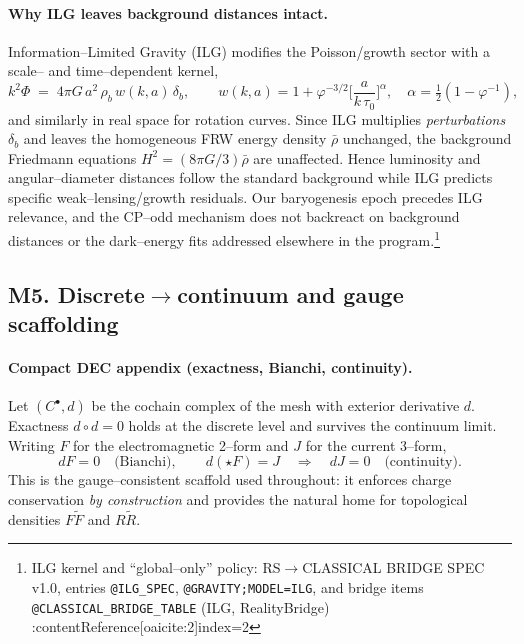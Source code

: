 \documentclass[11pt]{article}
\begin{document}
\paragraph{Why ILG leaves background distances intact.}
Information–Limited Gravity (ILG) modifies the Poisson/growth sector with a scale– and time–dependent kernel,
\begin{equation}
  k^2 \Phi \;=\; 4\pi G\,a^2\,\rho_b\,w(k,a)\,\delta_b,\qquad
  w(k,a)=1+\varphi^{-3/2}\Big[\frac{a}{k\,\tau_0}\Big]^{\alpha},\quad \alpha=\tfrac12(1-\varphi^{-1}),
\end{equation}
and similarly in real space for rotation curves. Since ILG multiplies \emph{perturbations} \(\delta_b\) and leaves the homogeneous FRW energy density \(\bar\rho\) unchanged, the background Friedmann equations
\(
  H^2=(8\pi G/3)\bar\rho
\)
are unaffected. Hence luminosity and angular–diameter distances follow the standard background while ILG predicts specific weak–lensing/growth residuals. Our baryogenesis epoch precedes ILG relevance, and the CP–odd mechanism does not backreact on background distances or the dark–energy fits addressed elsewhere in the program.\footnote{ILG kernel and “global–only” policy: RS\(\to\)CLASSICAL BRIDGE SPEC v1.0, entries \texttt{@ILG\_SPEC}, \texttt{@GRAVITY;MODEL=ILG}, and bridge items \texttt{@CLASSICAL\_BRIDGE\_TABLE} (ILG, RealityBridge) :contentReference[oaicite:2]{index=2}}

\bigskip

\subsection*{M5. Discrete$\to$continuum and gauge scaffolding}

\paragraph{Compact DEC appendix (exactness, Bianchi, continuity).}
Let \((C^\bullet,d)\) be the cochain complex of the mesh with exterior derivative \(d\). Exactness \(d\!\circ d=0\) holds at the discrete level and survives the continuum limit. Writing \(F\) for the electromagnetic 2–form and \(J\) for the current 3–form,
\begin{equation}
  dF=0 \quad\text{(Bianchi)},\qquad d(\star F)=J \quad\Rightarrow\quad dJ=0 \quad\text{(continuity)}.
\end{equation}
This is the gauge–consistent scaffold used throughout: it enforces charge conservation \emph{by construction} and provides the natural home for topological densities \(F\tilde F\) and \(R\tilde R\).
\end{document}
